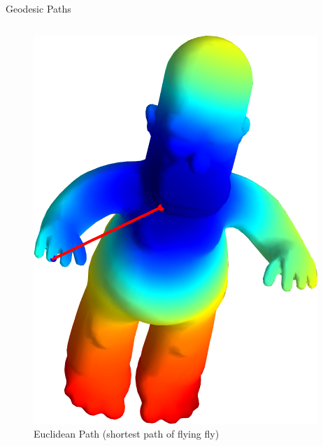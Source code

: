 \documentclass{beamer}
\begin{document}
\begin{frame}{Geodesic Paths}
\begin{columns}
\begin{column}[T]{4cm}
\begin{figure}[t]
    \includegraphics[width=\textwidth]{EuclideanPath_Beard_LFinger.png}
    \caption*{Euclidean Path (shortest path of flying fly)}
\end{figure}
\end{column}
\end{columns}
\end{frame}
\end{document}
